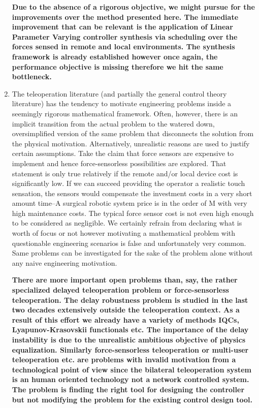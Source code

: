 \begin{enumerate}
    {\bfseries Due to the absence of a rigorous objective, we might pursue for the improvements over the method presented here. The 
    immediate improvement that can be relevant is the application of Linear Parameter Varying controller synthesis via scheduling over the 
    forces sensed in remote and local environments. The synthesis framework is already established however once again, the performance 
    objective is missing therefore we hit the same bottleneck. 
    }
    \item The teleoperation literature (and partially the general control theory literature) has the tendency to motivate engineering 
    problems inside a seemingly rigorous mathematical framework. Often, however, there is an implicit transition from the actual problem to 
    the watered down, oversimplified version of the same problem that disconnects the solution from the physical motivation. Alternatively, 
    unrealistic reasons are used to justify certain assumptions. Take the claim that force sensors are expensive to implement and hence 
    force-sensorless possibilities are explored. That statement is only true relatively if the remote and/or local device cost is 
    significantly low. If we can succeed providing the operator a realistic touch sensation, the sensors would compensate the investment 
    costs in a very short amount time--A surgical robotic system price is in the order of M\EUR{} with very high maintenance 
    costs. The typical force sensor cost is not even high enough to be considered as negligible. We certainly refrain from declaring what 
    is worth of focus or not however motivating a mathematical problem with questionable engineering scenarios is false and unfortunately 
    very common. Same problems can be investigated for the sake of the problem alone without any naive engineering motivation.
    
    {\bfseries There are more important open problems than, say, the rather specialized delayed teleoperation problem or force-sensorless 
    teleoperation. The delay robustness problem is studied in the last two decades extensively outside the teleoperation context. As a result 
    of this effort we already have a variety of methods IQCs, Lyapunov-Krasovskii functionals etc. The importance of the delay instability is 
    due to the unrealistic ambitious objective of physics equalization. Similarly force-sensorless teleoperation or multi-user teleoperation 
    etc. are problems with invalid motivation from a technological point of view since the bilateral teleoperation system is an human oriented
    technology not a network controlled system. The problem is finding the right tool for designing the controller but not modifying the 
    problem for the existing control design tool.
    }
    
\end{enumerate}


